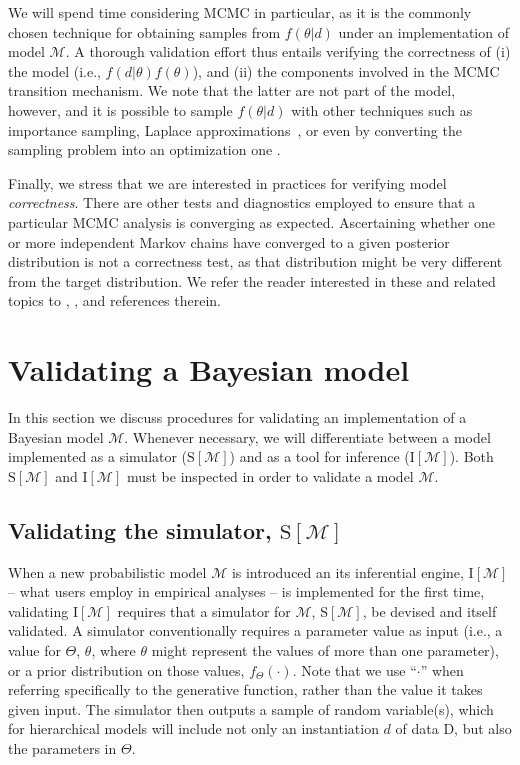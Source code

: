 \documentclass[oneside]{article}
\begin{document}
We will spend time considering MCMC in particular, as it is the commonly chosen technique for obtaining samples from $f(\theta|d)$ under an implementation of model $\mathcal{M}$.
A thorough validation effort thus entails verifying the correctness of (i) the model (i.e., $f(d|\theta)f(\theta)$), and (ii) the components involved in the MCMC transition mechanism.
We note that the latter are not part of the model, however, and it is  possible to sample $f(\theta|d)$ with other techniques such as importance sampling, Laplace approximations~\citep{inla}, or even by converting the sampling problem into an optimization one \citep[e.g.,][]{zhang18}.

Finally, we stress that we are interested in practices for verifying model \emph{correctness}.
There are other tests and diagnostics employed to ensure that a particular MCMC analysis is converging as expected.
Ascertaining whether one or more independent Markov chains have converged to a given posterior distribution is not a correctness test, as that distribution might be very different from the target distribution. 
We refer the reader interested in these and related topics to \cite{rwty}, \cite{fabreti2022},  \cite{magee2023} and references therein.

\section*{Validating a Bayesian model}

In this section we discuss procedures for validating an implementation of a Bayesian model $\mathcal{M}$.
Whenever necessary, we will differentiate between a model implemented as a simulator ($\text{S}[\mathcal{M}]$) and as a tool for inference ($\text{I}[\mathcal{M}]$).
Both $\text{S}[\mathcal{M}]$ and $\text{I}[\mathcal{M}]$ must be inspected in order to validate a model $\mathcal{M}$.

\subsection*{Validating the simulator, $\text{S}[\mathcal{M}]$}
\label{verify-correctness-of-simulator-implementation}

When a new probabilistic model $\mathcal{M}$ is introduced an its inferential engine, $\text{I}[\mathcal{M}]$ -- what users employ in empirical analyses -- is implemented for the first time, validating $\text{I}[\mathcal{M}]$ requires that a simulator for $\mathcal{M}$, $\text{S}[\mathcal{M}]$, be devised and itself validated.
A simulator conventionally requires a parameter value as input (i.e., a value for $\Theta$, $\theta$, where $\theta$ might represent the values of more than one parameter), or a prior distribution on those values, $f_\Theta(\cdot)$. 
Note that we use ``$\cdot$'' when referring specifically to the generative function, rather than the value it takes given input.
The simulator then outputs a sample of random variable(s), which for hierarchical models will include not only an instantiation $d$ of data $\text{D}$, but also the parameters in $\Theta$.
\end{document}
